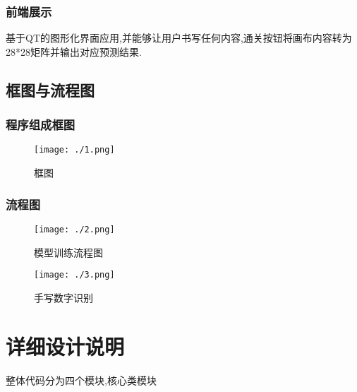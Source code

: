 \documentclass{ctexart} %
\begin{document}
\subsubsection{前端展示}
基于QT的图形化界面应用,并能够让用户书写任何内容,通关按钮将画布内容转为28*28矩阵并输出对应预测结果.

\subsection{框图与流程图}
\subsubsection{程序组成框图}
\begin{figure}[htbp]
  \centering
  \texttt{[image: ./1.png]}
  \caption{框图}
  \label{fig:my_awesome_figure}
\end{figure}
\subsubsection{流程图}
\begin{figure}[htbp]
    \centering
    \begin{minipage}[t]{0.48\textwidth} %
        \centering
        \texttt{[image: ./2.png]} %
        \caption{模型训练流程图}
        \label{fig:model_training} %
    \end{minipage}
    \hfill %
    \begin{minipage}[t]{0.48\textwidth}
        \centering
        \texttt{[image: ./3.png]}
        \caption{手写数字识别}
        \label{fig:handwriting_recognition} %
    \end{minipage}
\end{figure}

\section{详细设计说明}
整体代码分为四个模块,{核心类模块}
\end{document}
